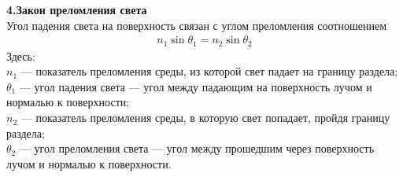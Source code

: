 	\textbf{4.Закон преломления света}\\
	Угол падения света на поверхность связан с углом преломления соотношением
	\begin{gather*}
n_{1}\sin \theta _{1}=n_{2}\sin \theta _{2}
	\end{gather*}
	Здесь:\\
	
$n_{1}$ — показатель преломления среды, из которой свет падает на границу раздела;
$\theta _{1}$ — угол падения света — угол между падающим на поверхность лучом и нормалью к поверхности;\\
$n_{2}$ — показатель преломления среды, в которую свет попадает, пройдя границу раздела;\\
$\theta _{2}$ — угол преломления света — угол между прошедшим через поверхность лучом и нормалью к поверхности.\\
